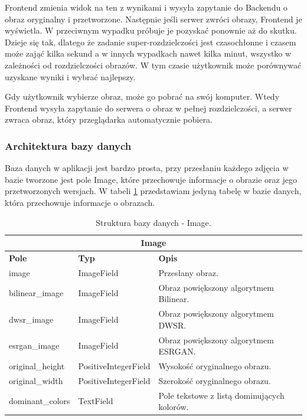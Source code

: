 Frontend zmienia widok na ten z wynikami i wysyła zapytanie do Backendu o obraz oryginalny i przetworzone. Następnie jeśli serwer zwróci obrazy, Frontend je wyświetla. W przeciwnym wypadku próbuje je pozyskać ponownie aż do skutku. Dzieje się tak, dlatego że zadanie super-rozdzielczości jest czasochłonne i czasem może zająć kilka sekund a w innych wypadkach nawet kilka minut, wszystko w zależności od rozdzielczości obrazów. W tym czasie użytkownik może porównywać uzyskane wyniki i wybrać najlepszy. 

Gdy użytkownik wybierze obraz, może go pobrać na swój komputer. Wtedy Frontend wysyła zapytanie do serwera o obraz w pełnej rozdzielczości, a serwer zwraca obraz, który przeglądarka automatycznie pobiera.

\subsubsection*{Architektura bazy danych}

Baza danych w aplikacji jest bardzo prosta, przy przesłaniu każdego zdjęcia w bazie tworzone jest pole Image, które przechowuje informacje o obrazie oraz jego przetworzonych wersjach. W tabeli \ref{tab:image_model} przedstawiam jedyną tabelę w bazie danych, która przechowuje informacje o obrazach.

\begin{table}[ht]
    \centering
    \renewcommand{\arraystretch}{1.5} %
    \begin{tabular}{|l|l|p{8cm}|}
    \hline
    \multicolumn{3}{|c|}{\textbf{Image}}                                                        \\ \hline
    \textbf{Pole}       & \textbf{Typ}          & \textbf{Opis}                                 \\ \hline
    image               & ImageField            & Przesłany obraz.                              \\ \hline
    bilinear\_image     & ImageField            & Obraz powiększony algorytmem Bilinear.        \\ \hline
    dwsr\_image         & ImageField            & Obraz powiększony algorytmem DWSR.            \\ \hline
    esrgan\_image       & ImageField            & Obraz powiększony algorytmem ESRGAN.          \\ \hline
    original\_height    & PositiveIntegerField  & Wysokość oryginalnego obrazu.                 \\ \hline
    original\_width     & PositiveIntegerField  & Szerokość oryginalnego obrazu.                \\ \hline
    dominant\_colors    & TextField             & Pole tekstowe z listą dominujących kolorów.   \\ \hline
    \end{tabular}
    \caption{Struktura bazy danych - Image.}
    \label{tab:image_model}
\end{table}

